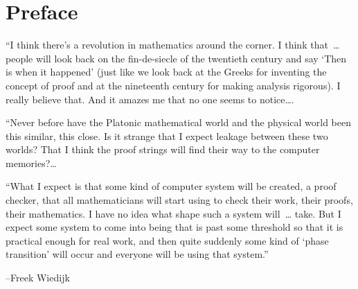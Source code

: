 
\chapter*{Preface}


%
%
%




{

\narrower

{\it

  ``I think there's a revolution in mathematics around the corner. I
  think that~\dots{}   %
  people will look back on the fin-de-siecle of the twentieth century
  and say `Then is when it happened' (just like we look back at the
  Greeks for inventing the concept of proof and at the nineteenth
  century for making analysis rigorous). I really believe that. And it
  amazes me that no one seems to notice\dots.

  ``Never before have the Platonic mathematical world and the physical
  world been this similar, this close. Is it strange that I expect
  leakage between these two worlds? That I think the proof strings
  will find their way to the computer memories?\dots 

  ``What I expect is that some kind of computer system will be
  created, a proof checker, that all mathematicians will start using
  to check their work, their proofs, their mathematics. I have no idea
  what shape such a system will~\dots{}  take. But I expect some
  system to come into being that is past some threshold so that it is
  practical enough for real work, and then quite suddenly some kind of
  `phase transition' will occur and everyone will be using that
  system.''

{\hfill\rm--Freek Wiedijk~\cite{FWR}} %

}

}

